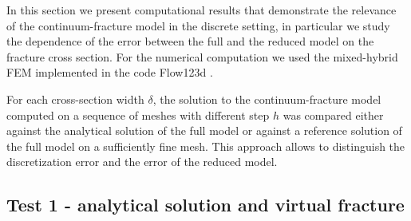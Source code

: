 \documentclass{llncs}
\def\norm#1{\|#1\|}
\begin{document}
In this section we present computational results that demonstrate the relevance of the continuum-fracture model
in the discrete setting, in particular we study the dependence of the error between the full and the reduced model on the fracture cross section.
For the numerical computation we used the mixed-hybrid FEM implemented in the code Flow123d \cite{flow123d}.

For each cross-section width $\delta$, the solution to the continuum-fracture model computed on a sequence
of meshes with different step $h$ was compared either against the analytical solution of the full model 
or against a reference solution of the full model on a sufficiently fine mesh. 
This approach allows to distinguish the discretization error and the error of the reduced model.



\subsection{Test 1 - analytical solution and virtual fracture}
\end{document}
